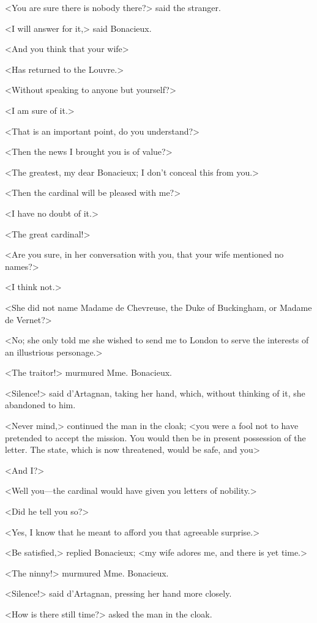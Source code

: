 <You are sure there is nobody there?> said the stranger. 

<I will answer for it,> said Bonacieux. 

<And you think that your wife\longdash> 

<Has returned to the Louvre.> 

<Without speaking to anyone but yourself?> 

<I am sure of it.> 

<That is an important point, do you understand?> 

<Then the news I brought you is of value?> 

<The greatest, my dear Bonacieux; I don't conceal this from you.> 

<Then the cardinal will be pleased with me?> 

<I have no doubt of it.> 

<The great cardinal!> 

<Are you sure, in her conversation with you, that your wife mentioned no names?> 

<I think not.> 

<She did not name Madame de Chevreuse, the Duke of Buckingham, or Madame de Vernet?> 

<No; she only told me she wished to send me to London to serve the interests of an illustrious personage.> 

<The traitor!> murmured Mme. Bonacieux. 

<Silence!> said d'Artagnan, taking her hand, which, without thinking of it, she abandoned to him. 

<Never mind,> continued the man in the cloak; <you were a fool not to have pretended to accept the mission. You would then be in present possession of the letter. The state, which is now threatened, would be safe, and you\longdash> 

<And I?> 

<Well you---the cardinal would have given you letters of nobility.> 

<Did he tell you so?> 

<Yes, I know that he meant to afford you that agreeable surprise.> 

<Be satisfied,> replied Bonacieux; <my wife adores me, and there is yet time.> 

<The ninny!> murmured Mme. Bonacieux. 

<Silence!> said d'Artagnan, pressing her hand more closely. 

<How is there still time?> asked the man in the cloak. 

